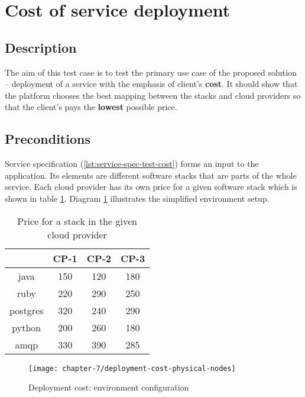 \section{Cost of service deployment}
\subsection*{Description}
The aim of this test case is to test the primary use case of the proposed solution -- deployment of a service with the emphasis of client's \textbf{cost}. It should show that the platform chooses the best mapping between the stacks and cloud providers so that the client's pays the \textbf{lowest} possible price.

\subsection*{Preconditions}
Service specification (\ref{lst:service-spec-test-cost}) forms an input to the application. Its elements are different software stacks that are parts of the whole service. Each cloud provider has its own price for a given software stack which is shown in table \ref{tbl:test-service-deployment-cost}. Diagram \ref{eval:deployment-cost-physical-nodes} illustrates the simplified environment setup.

\begin{table}
  \centering
  \begin{tabular}{ | c | c | c | c | }
    \hline                        
    & CP-1 & CP-2 & CP-3 \\
    \hline
    java      & 150 & 120 & 180 \\
    ruby      & 220 & 290 & 250 \\
    postgres  & 320 & 240 & 290 \\
    python    & 200 & 260 & 180 \\
    amqp      & 330 & 390 & 285 \\
    \hline  
  \end{tabular}
  \caption{Price for a stack in the given cloud provider}
  \label{tbl:test-service-deployment-cost}
\end{table}

\begin{figure}[!ht]
  \begin{center}
    \texttt{[image: chapter-7/deployment-cost-physical-nodes]}
  \end{center}
  \caption{Deployment cost: environment configuration}
  \label{eval:deployment-cost-physical-nodes}
\end{figure}


